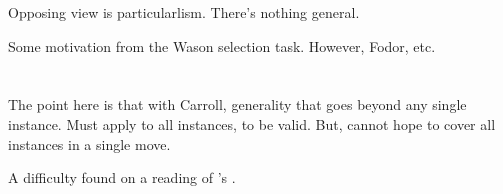 \begin{note}
  Opposing view is particularlism.
  There's nothing general.

  Some motivation from the Wason selection task.
  However, Fodor, etc.
\end{note}

\section{\citeauthor{Carroll:1895uj}}

\nocite{Black:1951aa}

\begin{note}
  The point here is that with Carroll, generality that goes beyond any single instance.
  Must apply to all instances, to be valid.
  But, cannot hope to cover all instances in a single move.
\end{note}

\begin{note}
  A difficulty found on a reading of \citeauthor{Carroll:1895uj}'s .
\end{note}

